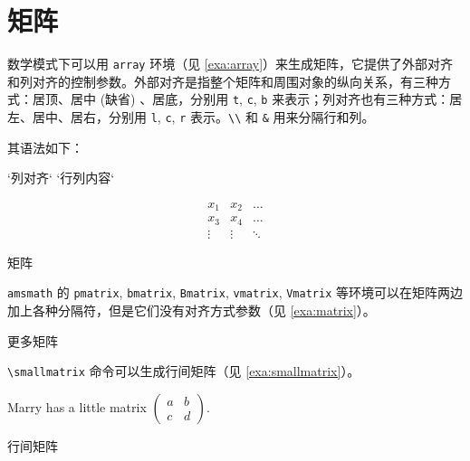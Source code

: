 \section{矩阵}

数学模式下可以用 \texttt{array} 环境（见 \autoref{exa:array}）来生成矩阵，它提供了外部对齐和列对齐的控制参数。外部对齐是指整个矩阵和周围对象的纵向关系，有三种方式：居顶、居中 (缺省) 、居底，分别用 \texttt{t}, \texttt{c}, \texttt{b} 来表示；列对齐也有三种方式：居左、居中、居右，分别用 \texttt{l}, \texttt{c}, \texttt{r} 表示。\verb|\\| 和 \verb|&| 用来分隔行和列。

其语法如下：

\begin{Code}[]
\begin{array}[`外部对齐`]{`列对齐`}
  `行列内容`
\end{array}
\end{Code}

\begin{example}[htbp]
\begin{RLDemo}[numbers=left]
\[ \begin{array}{ccc}
x_1 & x_2 & \dots \\
x_3 & x_4 & \dots \\
\vdots & \vdots & \ddots
\end{array} \]
\end{RLDemo}
\caption{矩阵}
\label{exa:array}
\end{example}

\texttt{amsmath} 的 \texttt{pmatrix}, \texttt{bmatrix}, \texttt{Bmatrix}, \texttt{vmatrix}, \texttt{Vmatrix} 等环境可以在矩阵两边加上各种分隔符，但是它们没有对齐方式参数（见 \autoref{exa:matrix}）。

\begin{example}[htbp]
\caption{更多矩阵}
\label{exa:matrix}
\end{example}

\verb|\smallmatrix| 命令可以生成行间矩阵（见 \autoref{exa:smallmatrix}）。

\begin{example}[!h]
\begin{BTDemo}[]
Marry has a little matrix $ ( \begin{smallmatrix} 
a&b\\c&d \end{smallmatrix} ) $.
\end{BTDemo}
\caption{行间矩阵}
\label{exa:smallmatrix}
\end{example}

